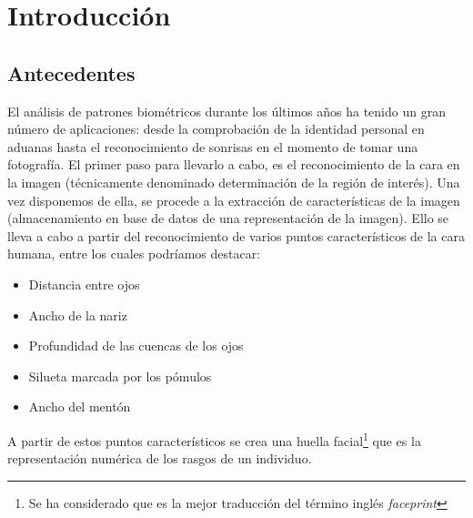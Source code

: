 %
%

\chapter{Introducción}


\section{Antecedentes}
El análisis de patrones biométricos durante los últimos años ha tenido un gran número de aplicaciones: desde la comprobación de la identidad personal en aduanas hasta el reconocimiento de sonrisas en el momento de tomar una fotografía. El primer paso para llevarlo a cabo, es el reconocimiento de la cara en la imagen (técnicamente denominado determinación de la región de interés). Una vez disponemos de ella, se procede a la extracción de características de la imagen (almacenamiento en base de datos de una representación de la imagen). Ello se lleva a cabo a partir del reconocimiento de varios puntos característicos de la cara humana, entre los cuales podríamos destacar:

\begin{itemize}
	\item{Distancia entre ojos}
	\item{Ancho de la nariz}
	\item{Profundidad de las cuencas de los ojos}
	\item{Silueta marcada por los pómulos}
	\item{Ancho del mentón}
\end{itemize}


A partir de estos puntos característicos se crea una huella facial\footnote{Se ha considerado que es la mejor traducción del término inglés \textit{faceprint}} que es la representación numérica de los rasgos de un individuo.


